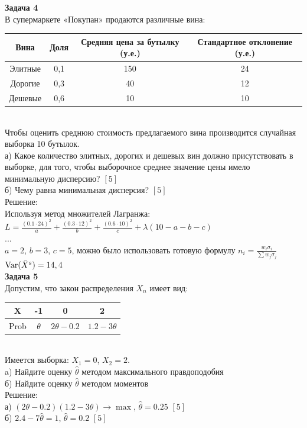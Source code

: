 \documentclass[12pt, a4paper]{article}\usepackage[]{graphicx}\usepackage[]{color}
\begin{document}
\textbf{Задача 4} \\ %
В супермаркете «Покупан» продаются различные вина: \\
\begin{tabular}{|c|c|c|c|}
  \hline
  Вина & Доля & Средняя цена за бутылку (у.е.) & Стандартное отклонение (у.е.) \\
  \hline
  Элитные & 0,1 & 150 & 24 \\
  Дорогие & 0,3 & 40 & 12 \\
  Дешевые & 0,6 & 10 & 10 \\
  \hline
\end{tabular} \\
Чтобы оценить среднюю стоимость предлагаемого вина производится
случайная выборка 10 бутылок. \\
а) Какое количество элитных, дорогих и дешевых вин должно
присутствовать в выборке, для того, чтобы выборочное среднее
значение цены имело минимальную дисперсию? $[5]$ \\
б) Чему равна минимальная дисперсия? $[5]$ \\
Решение: \\
Используя метод множителей Лагранжа: \\
$L=\frac{(0.1\cdot 24)^{2}}{a}+\frac{(0.3\cdot
12)^{2}}{b}+\frac{(0.6\cdot 10)^{2}}{c}+\lambda(10-a-b-c)$\\
... \\
$a=2$, $b=3$, $c=5$, можно было использовать готовую формулу
$n_{i}=\frac{w_{i}\sigma_{i}}{\sum w_{j}\sigma_{j}}$ \\
$\operatorname{Var}(\bar{X}^{s})=14,4$ \\



\textbf{Задача 5} \\ %
Допустим, что закон распределения $X_{n}$ имеет вид: \\
\begin{tabular}{|c|c|c|c|}
  \hline
  X & -1 & 0 & 2 \\
  \hline
  Prob & $\theta$ & $2\theta-0.2$ & $1.2-3\theta$ \\
  \hline
\end{tabular} \\
Имеется выборка: $X_{1}=0$, $X_{2}=2$. \\
a) Найдите оценку $\hat{\theta}$ методом максимального правдоподобия \\
б) Найдите оценку $\hat{\theta}$ методом моментов \\
Решение: \\
а) $(2\theta-0.2)(1.2-3\theta)\rightarrow\max$,
$\hat{\theta}=0.25$ $[5]$\\
б) $2.4-7\hat{\theta}=1$, $\hat{\theta}=0.2$ $[5]$\\
\end{document}
